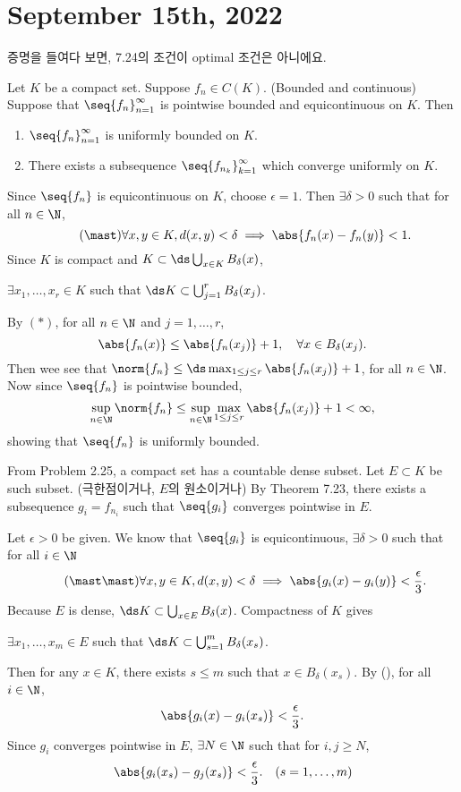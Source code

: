 \section*{September 15th, 2022}

증명을 들여다 보면, 7.24의 조건이 optimal 조건은 아니에요.

  Let \(K\) be a compact set. Suppose \(f_n \in C(K)\). (Bounded and continuous) Suppose that \(\seq{f_n}_{n=1}^\infty\) is pointwise bounded and equicontinuous on \(K\). Then
\begin{enumerate}
    \item \(\seq{f_n}_{n=1}^\infty\) is uniformly bounded on \(K\).
    \item There exists a subsequence \(\seq{f_{n_k}}_{k=1}^\infty\) which converge uniformly on \(K\).
\end{enumerate}

\pf Since \(\seq{f_n}\) is equicontinuous on \(K\), choose \(\epsilon = 1\). Then \(\exists \delta > 0\) such that for all \(n \in \N\),
\[ \tag{\mast}
    \forall x, y \in K, d(x, y) < \delta \implies \abs{f_n(x) - f_n(y)} < 1.
\]
Since \(K\) is compact and \(K \subset \ds\bigcup_{x \in K} B_\delta(x)\),
\begin{center}
    \(\exists x_1, \dots, x_r \in K\) such that \(\ds K \subset \bigcup_{j = 1}^r B_\delta(x_j)\).
\end{center}
By \((\ast)\), for all \(n \in \N\) and \(j = 1, \dots, r\),
\[
    \abs{f_n(x)} \leq \abs{f_n(x_j)} + 1, \quad \forall x \in B_\delta(x_j).
\]
Then wee see that \(\norm{f_n} \leq \ds \max_{1\leq j\leq r} \abs{f_n(x_j)} + 1\), for all \(n \in \N\). Now since \(\seq{f_n}\) is pointwise bounded,
\[
    \sup_{n \in \N} \norm{f_n} \leq \sup_{n \in \N}\max_{1 \leq j \leq r} \abs{f_n(x_j)} + 1 < \infty,
\]
showing that \(\seq{f_n}\) is uniformly bounded.

From Problem 2.25, a compact set has a countable dense subset. Let \(E \subset K\) be such subset. (극한점이거나, \(E\)의 원소이거나) By Theorem 7.23, there exists a subsequence \(g_i = f_{n_i}\) such that \(\seq{g_i}\) converges pointwise in \(E\).

Let \(\epsilon > 0\) be given. We know that \(\seq{g_i}\) is equicontinuous, \(\exists \delta > 0\) such that for all \(i \in \N\)
\[ \tag{\mast\mast}
    \forall x, y \in K, d(x, y) < \delta \implies \abs{g_i(x) - g_i(y)} < \dfrac{\epsilon}{3}.
\]
Because \(E\) is dense, \(\ds K \subset \bigcup_{x \in E} B_\delta(x)\). Compactness of \(K\) gives
\begin{center}
    \(\exists x_1, \dots, x_m \in E\) such that \(\ds K \subset \bigcup_{s = 1}^m B_\delta(x_s)\).
\end{center}
Then for any \(x \in K\), there exists \(s \leq m\) such that \(x \in B_\delta(x_s)\). By (\mast\mast), for all \(i \in \N\),
\[
    \abs{g_i(x) - g_i(x_s)} < \frac{\epsilon}{3}.
\]
Since \(g_i\) converges pointwise in \(E\), \(\exists N \in \N\) such that for \(i, j \geq N\),
\[
    \abs{g_i(x_s) - g_j(x_s)} < \frac{\epsilon}{3}. \quad (s = 1, \dots, m)
\]

